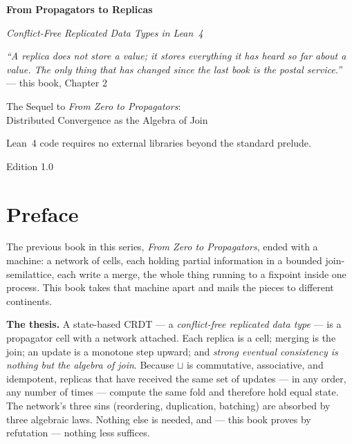 \documentclass[12pt, a4paper, openright]{book}
\theoremstyle{thmstyle}
\theoremstyle{defstyle}
\newcounter{refutation}[chapter]
\begin{document}
\frontmatter

\begin{titlepage}
  \centering
  \vspace*{2cm}
  {\Huge\bfseries From Propagators to Replicas\par}
  \vspace{0.5cm}
  {\large\itshape Conflict-Free Replicated Data Types in Lean~4\par}
  \vspace{3cm}
  \begin{tcolorbox}[width=0.75\textwidth,
                    colback=gray!8, colframe=gray!50, arc=4pt,
                    boxrule=0.6pt]
    \small\centering
    \textit{``A replica does not store a value; it stores everything it
    has heard so far about a value. The only thing that has changed
    since the last book is the postal service.''}\\[4pt]
    --- this book, Chapter 2
  \end{tcolorbox}
  \vfill
  {\large The Sequel to \emph{From Zero to Propagators}:\\
  Distributed Convergence as the Algebra of Join\par}
  \vspace{1cm}
  {\normalsize Lean~4 code requires no external libraries beyond the standard prelude.\par}
  \vspace{0.5cm}
  {\small\color{gray} Edition 1.0\par}
\end{titlepage}

\chapter*{Preface}

The previous book in this series, \emph{From Zero to Propagators}, ended
with a machine: a network of cells, each holding partial information in a
bounded join-semilattice, each write a merge, the whole thing running to a
fixpoint inside one process. This book takes that machine apart and mails
the pieces to different continents.

\medskip
\textbf{The thesis.}
A state-based CRDT --- a \emph{conflict-free replicated data type} --- is a
propagator cell with a network attached. Each replica is a cell; merging is
the join; an update is a monotone step upward; and \emph{strong eventual
consistency is nothing but the algebra of join}. Because $\sqcup$ is
commutative, associative, and idempotent, replicas that have received the
same set of updates --- in any order, any number of times --- compute the
same fold and therefore hold equal state. The network's three sins
(reordering, duplication, batching) are absorbed by three algebraic
laws. Nothing else is needed, and --- this book proves by refutation ---
nothing less suffices.
\end{document}

